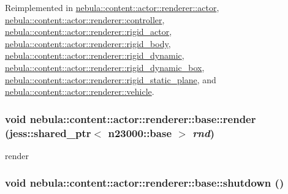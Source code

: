 Reimplemented in \hyperlink{classnebula_1_1content_1_1actor_1_1renderer_1_1actor_ac6d5635a4fcdbf531ff46b4c9f9623c7}{nebula::content::actor::renderer::actor}, \hyperlink{classnebula_1_1content_1_1actor_1_1renderer_1_1controller_ac8f4e2e48a0a0652e469313b798bfac8}{nebula::content::actor::renderer::controller}, \hyperlink{classnebula_1_1content_1_1actor_1_1renderer_1_1rigid__actor_a595700dbe653ae7c64b01ad332065725}{nebula::content::actor::renderer::rigid\_\-actor}, \hyperlink{classnebula_1_1content_1_1actor_1_1renderer_1_1rigid__body_a448e47741d24ba24fbedbd7438159a12}{nebula::content::actor::renderer::rigid\_\-body}, \hyperlink{classnebula_1_1content_1_1actor_1_1renderer_1_1rigid__dynamic_ae90eb12e9f68833bd1bf0b8360332f49}{nebula::content::actor::renderer::rigid\_\-dynamic}, \hyperlink{classnebula_1_1content_1_1actor_1_1renderer_1_1rigid__dynamic__box_a26efbc775da4307f9294dab260b43723}{nebula::content::actor::renderer::rigid\_\-dynamic\_\-box}, \hyperlink{classnebula_1_1content_1_1actor_1_1renderer_1_1rigid__static__plane_a6038d69ad558ad5bfa9e52a7f01afd0b}{nebula::content::actor::renderer::rigid\_\-static\_\-plane}, and \hyperlink{classnebula_1_1content_1_1actor_1_1renderer_1_1vehicle_a3687fe4866ea01c7f21356c2f7739493}{nebula::content::actor::renderer::vehicle}.\hypertarget{classnebula_1_1content_1_1actor_1_1renderer_1_1base_a1f2728ff9bb63fa3f62a4ad6dff7d825}{
\subsubsection[{render}]{\setlength{\rightskip}{0pt plus 5cm}void nebula::content::actor::renderer::base::render (jess::shared\_\-ptr$<$ {\bf n23000::base} $>$ {\em rnd})}}
\label{classnebula_1_1content_1_1actor_1_1renderer_1_1base_a1f2728ff9bb63fa3f62a4ad6dff7d825}


render \hypertarget{classnebula_1_1content_1_1actor_1_1renderer_1_1base_abb61c46f573309a2f96a7fe6b95f5cd3}{
\subsubsection[{shutdown}]{\setlength{\rightskip}{0pt plus 5cm}void nebula::content::actor::renderer::base::shutdown ()}}
\label{classnebula_1_1content_1_1actor_1_1renderer_1_1base_abb61c46f573309a2f96a7fe6b95f5cd3}


